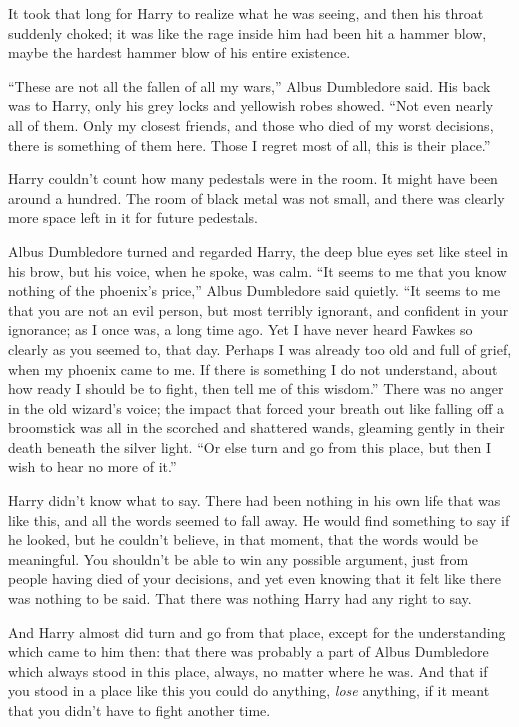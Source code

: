 It took that long for Harry to realize what he was seeing, and then his throat suddenly choked; it was like the rage inside him had been hit a hammer blow, maybe the hardest hammer blow of his entire existence.

“These are not all the fallen of all my wars,” Albus Dumbledore said. His back was to Harry, only his grey locks and yellowish robes showed. “Not even nearly all of them. Only my closest friends, and those who died of my worst decisions, there is something of them here. Those I regret most of all, this is their place.”

Harry couldn’t count how many pedestals were in the room. It might have been around a hundred. The room of black metal was not small, and there was clearly more space left in it for future pedestals.

Albus Dumbledore turned and regarded Harry, the deep blue eyes set like steel in his brow, but his voice, when he spoke, was calm. “It seems to me that you know nothing of the phoenix’s price,” Albus Dumbledore said quietly. “It seems to me that you are not an evil person, but most terribly ignorant, and confident in your ignorance; as I once was, a long time ago. Yet I have never heard Fawkes so clearly as you seemed to, that day. Perhaps I was already too old and full of grief, when my phoenix came to me. If there is something I do not understand, about how ready I should be to fight, then tell me of this wisdom.” There was no anger in the old wizard’s voice; the impact that forced your breath out like falling off a broomstick was all in the scorched and shattered wands, gleaming gently in their death beneath the silver light. “Or else turn and go from this place, but then I wish to hear no more of it.”

Harry didn’t know what to say. There had been nothing in his own life that was like this, and all the words seemed to fall away. He would find something to say if he looked, but he couldn’t believe, in that moment, that the words would be meaningful. You shouldn’t be able to win any possible argument, just from people having died of your decisions, and yet even knowing that it felt like there was nothing to be said. That there was nothing Harry had any right to say.

And Harry almost did turn and go from that place, except for the understanding which came to him then: that there was probably a part of Albus Dumbledore which always stood in this place, always, no matter where he was. And that if you stood in a place like this you could do anything, \emph{lose} anything, if it meant that you didn’t have to fight another time.

